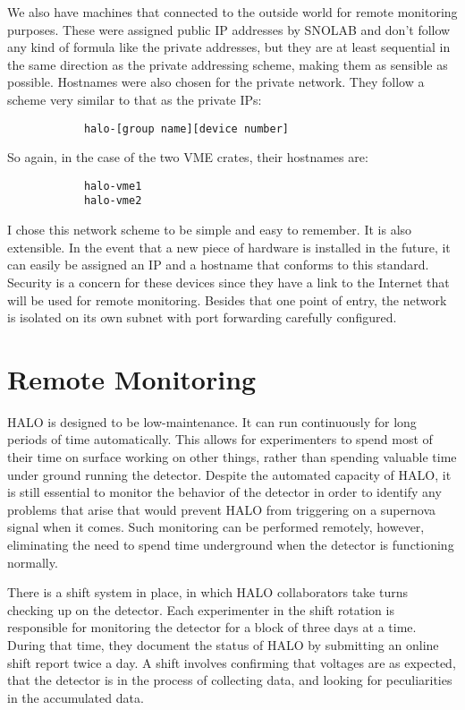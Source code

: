 		We also have machines that connected to the outside world for remote monitoring purposes. These were assigned public IP addresses by SNOLAB and don't follow any kind of formula like the private addresses, but they are at least sequential in the same direction as the private addressing scheme, making them as sensible as possible. Hostnames were also chosen for the private network. They follow a scheme very similar to that as the private IPs:
		\begin{verbatim}
		    halo-[group name][device number]
		\end{verbatim}
		So again, in the case of the two VME crates, their hostnames are:
		\begin{verbatim}
		    halo-vme1
		    halo-vme2
		\end{verbatim}

		I chose this network scheme to be simple and easy to remember. It is also extensible. In the event that a new piece of hardware is installed in the future, it can easily be assigned an IP and a hostname that conforms to this standard. Security is a concern for these devices since they have a link to the Internet that will be used for remote monitoring. Besides that one point of entry, the network is isolated on its own subnet with port forwarding carefully configured.

	
	\section{Remote Monitoring}
		HALO is designed to be low-maintenance. It can run continuously for long periods of time automatically. This allows for experimenters to spend most of their time on surface working on other things, rather than spending valuable time under ground running the detector. Despite the automated capacity of HALO, it is still essential to monitor the behavior of the detector in order to identify any problems that arise that would prevent HALO from triggering on a supernova signal when it comes. Such monitoring can be performed remotely, however, eliminating the need to spend time underground when the detector is functioning normally.

		There is a shift system in place, in which HALO collaborators take turns checking up on the detector. Each experimenter in the shift rotation is responsible for monitoring the detector for a block of three days at a time. During that time, they document the status of HALO by submitting an online shift report twice a day. A shift involves confirming that voltages are as expected, that the detector is in the process of collecting data, and looking for peculiarities in the accumulated data.

